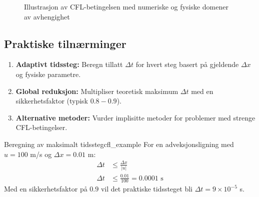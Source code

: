 \begin{figure}[H]
	\centering
	\caption{Illustrasjon av CFL-betingelsen med numeriske og fysiske domener av avhengighet}
	\label{fig:cfl-condition}
\end{figure}

\subsection{Praktiske tilnærminger}

\begin{enumerate}
	\item \textbf{Adaptivt tidssteg:} Beregn tillatt $\Delta t$ for hvert steg basert på gjeldende $\Delta x$ og fysiske parametre.
	
	\item \textbf{Global reduksjon:} Multipliser teoretisk maksimum $\Delta t$ med en sikkerhetsfaktor (typisk $0.8-0.9$).
	
	\item \textbf{Alternative metoder:} Vurder implisitte metoder for problemer med strenge CFL-betingelser.
\end{enumerate}

\begin{example}{Beregning av maksimalt tidssteg}{cfl_example}
	For en adveksjonsligning med $u = 100$ m/s og $\Delta x = 0.01$ m:
	\begin{align*}
		\Delta t &\leq \frac{\Delta x}{|u|} \\
		\Delta t &\leq \frac{0.01}{100} = 0.0001 \text{ s}
	\end{align*}
	Med en sikkerhetsfaktor på $0.9$ vil det praktiske tidssteget bli $\Delta t = 9 \times 10^{-5}$ s.
\end{example}


